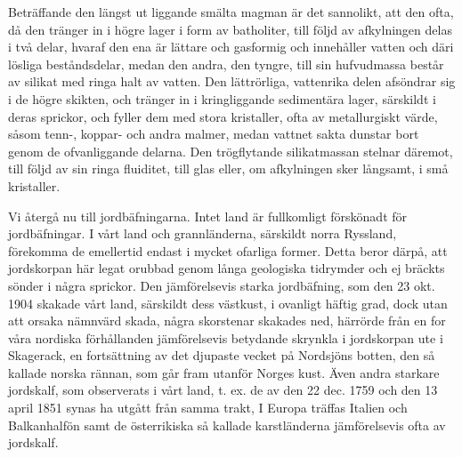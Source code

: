 \documentclass[a4paper, 12pt, oneside, swedish]{article}
\begin{document}
Beträffande den längst ut liggande smälta magman är det sannolikt, att den ofta, då den tränger in i högre lager i form av batholiter, till följd av afkylningen delas i två delar, hvaraf den ena är lättare och gasformig och innehåller vatten och däri lösliga beståndsdelar, medan den andra, den tyngre, till sin hufvudmassa består av silikat med ringa halt av vatten. Den lättrörliga, vattenrika delen afsöndrar sig i de högre skikten, och tränger in i kringliggande sedimentära lager, särskildt i deras sprickor, och fyller dem med stora kristaller, ofta av metallurgiskt värde, såsom tenn-, koppar- och andra malmer, medan vattnet sakta dunstar bort genom de ofvanliggande delarna. Den trögflytande silikatmassan stelnar däremot, till följd av sin ringa fluiditet, till glas eller, om afkylningen sker långsamt, i små kristaller.

Vi återgå nu till jordbäfningarna. Intet land är fullkomligt förskönadt för jordbäfningar. I vårt land och grannländerna, särskildt norra Ryssland, förekomma de emellertid endast i mycket ofarliga former. Detta beror därpå, att jordskorpan här legat orubbad genom långa geologiska tidrymder och ej bräckts sönder i några sprickor. Den jämförelsevis starka jordbäfning, som den 23 okt. 1904 skakade vårt land, särskildt dess västkust, i ovanligt häftig grad, dock utan att orsaka nämnvärd skada, några skorstenar skakades ned, härrörde från en for våra nordiska förhållanden jämförelsevis betydande skrynkla i jordskorpan ute i Skagerack, en fortsättning av det djupaste vecket på Nordsjöns botten, den så kallade norska rännan, som går fram utanför Norges kust. Även andra starkare jordskalf, som observerats i vårt land, t. ex. de av den 22 dec. 1759 och den 13 april 1851 synas ha utgått från samma trakt, I Europa träffas Italien och Balkanhalfön samt de österrikiska så kallade karstländerna jämförelsevis ofta av jordskalf.
\end{document}
